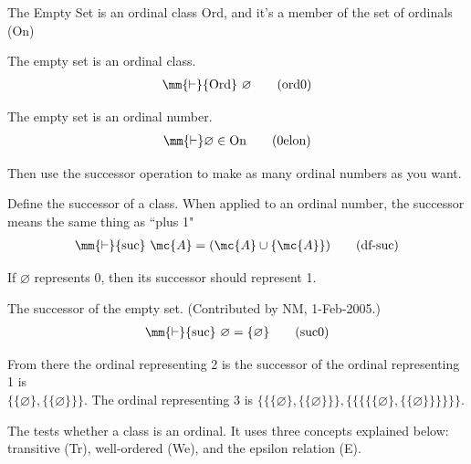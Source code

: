 
The Empty Set is an ordinal class {Ord}, and it's a member of the set of ordinals (On)

\begin{lemma} The empty set is an ordinal class. 
\begin{align}
\mm{\vdash} {\rm Ord}~ \varnothing\label{eq:ord0}\tag{ord0}
\end{align}
\end{lemma}

\begin{lemma} The empty set is an ordinal number. 
\begin{align}
\mm{\vdash} \varnothing \in {\rm On}\label{eq:0elon}\tag{0elon}
\end{align}
\end{lemma}


\pn Then use the successor operation to make as many ordinal numbers as you want.

\begin{metadefinition} Define the successor of a class.  When
applied to an ordinal number, the
     successor means the same thing as ``plus 1" 
\begin{align}
\mm{\vdash} {\rm suc}~ \mc{A} = ( \mc{A} \cup \{ \mc{A} \}
    )\label{eq:df-suc}\tag{df-suc}
\end{align}
\end{metadefinition}


\pn If $\varnothing$ represents 0, then its successor should represent 1.

\begin{lemma} The successor of the empty set.  (Contributed
by NM, 1-Feb-2005.)
\begin{align}
\mm{\vdash} {\rm suc}~ \varnothing = \{ \varnothing \}\label{eq:suc0}\tag{suc0}
\end{align}
\end{lemma}


\pn From there the ordinal representing 2 is the successor of the ordinal representing 1 is  \\
\( \{ \{ \varnothing \} , \{ \{ \varnothing \} \} \}  \).  
The ordinal representing 3 is 
\( \{ \{ \{ \varnothing \} , \{ \{ \varnothing \} \} \}  , \{ \{ \{ \{ \{ \varnothing \} , \{ \{ \varnothing \} \} \} \} \} \} \).  


\pn The  tests whether a class is an ordinal.  It uses three concepts explained below:  transitive (Tr), well-ordered (We), and the epsilon relation (E).

